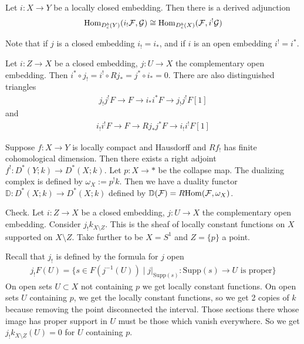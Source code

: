 \documentclass[12pt]{article}
\begin{document}
\begin{proposition}
    Let $i:X\to Y$ be a locally closed embedding. Then there is a derived adjunction
\begin{align*}
    \mathrm{Hom}_{D^b_c(Y)}(i_!{\mathcal{F}}, {\mathcal{G}}) \cong \mathrm{Hom}_{D^b_c(X)}({\mathcal{F}}, i^!{\mathcal{G}})
\end{align*}
\end{proposition}
Note that if $j$ is a closed embedding $i_! = i_*$, and if $i$ is an open embedding $i^! = i^*$.

\begin{theorem}
    Let $i:Z\to X$ be a closed embedding, $j:U\to X$ the complementary open embedding. Then $i^*\circ j_! = i^! \circ Rj_* = j^* \circ i_* = 0$.
    There are also distinguished triangles
\begin{align*}
    j_!j^! F \to F \to i_*i^* F \to j_!j^! F[1]
\end{align*}
and \begin{align*}
    i_!i^! F \to F \to Rj_*j^* F \to i_!i^! F[1]
\end{align*}
\end{theorem}

\begin{theorem}
    Suppose $f:X\to Y$ is locally compact and Hausdorff and $Rf_!$ has finite cohomological dimension. Then there exists a right adjoint $f^!:D^*(Y;k) \to D^*(X;k)$. Let $p:X\to *$ be the collapse map. The dualizing complex is defined by $\omega_X := p^!k$. Then we have a duality functor $\mathbb D: D^*(X;k) \to D^*(X;k)$ defined by $\mathbb D({\mathcal{F}}) = R\mathrm{Hom}({\mathcal{F}}, \omega_X)$.
\end{theorem}

Check. Let $i:Z\to X$ be a closed embedding, $j:U\to X$ the complementary open embedding. Consider $j_! k_{X\setminus Z}$. This is the sheaf of locally constant functions on $X$ supported on $X\setminus Z$. Take further to be $X=S^1$ and $Z=\{p\}$ a point. 

Recall that $j_!$ is defined by the formula for $j$ open
\begin{align*}
    j_!F(U) = \{s\in F(j^{-1}(U)) \mid j\vert_{\mathrm{Supp}(s)}: \mathrm{Supp}(s) \to U \text{ is proper}\}
\end{align*}
On open sets $U \subset X$ not containing $p$ we get locally constant functions. On open sets $U$ containing $p$, we get the locally constant functions, so we get 2 copies of $k$ because removing the point disconnected the interval. Those sections there whose image has proper support in $U$ must be those which vanish everywhere. So we get $j_! k_{X\setminus Z}(U) = 0$ for $U$ containing $p$. 
\end{document}
